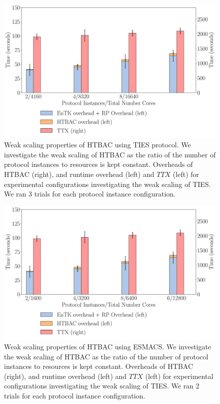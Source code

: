 \begin{figure}
  \centering
    \includegraphics[width=\columnwidth]{figures/new_ws_ties.pdf}
    \caption{Weak scaling properties of HTBAC using TIES protocol. We
    investigate the weak scaling of HTBAC as the ratio of the number of
    protocol instances to resources is kept constant. Overheads of HTBAC
    (right), and runtime overhead (left) and \(TTX\) (left) for experimental
    configurations investigating the weak scaling of TIES. We ran 3 trials
    for each protocol instance configuration.} 
\label{fig:weak_scaling_TIES}
\end{figure}

\begin{figure}
  \centering
    \includegraphics[width=\columnwidth]{figures/new_ws_esmacs.pdf}
    \caption{Weak scaling properties of HTBAC using ESMACS. We investigate
    the weak scaling of HTBAC as the ratio of the number of protocol
    instances to resources is kept constant. Overheads of HTBAC (right), and
    runtime overhead (left) and \(TTX\) (left) for experimental
    configurations investigating the weak scaling of TIES. We ran 2 trials
    for each protocol instance configuration.}
\label{fig:weak_scaling_ESMACS}
\end{figure}


